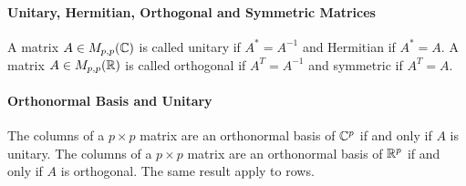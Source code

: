 \paragraph{Unitary, Hermitian, Orthogonal and Symmetric Matrices}
A matrix \(A \in M_{p,p}(\mathbb{C})\) is called unitary if \(A^* = A^{-1}\) and Hermitian if \(A^* = A\). A matrix \(A \in M_{p,p}(\mathbb{R})\) is called orthogonal if \(A^T = A^{-1}\) and symmetric if \(A^T = A\).

\paragraph{Orthonormal Basis and Unitary}
The columns of a \(p \times p\) matrix are an orthonormal basis of \(\mathbb{C}^p\) if and only if \(A\) is unitary. The columns of a \(p \times p\) matrix are an orthonormal basis of \(\mathbb{R}^p\) if and only if \(A\) is orthogonal. The same result apply to rows.